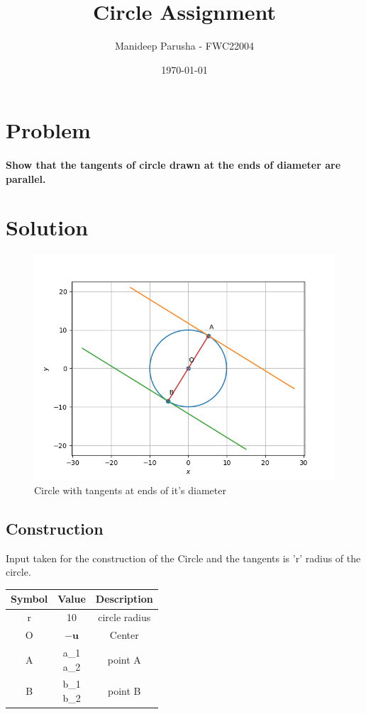 \documentclass[journal,12pt,twocolumn]{article}
\title{\textbf{Circle Assignment}}
\author{Manideep Parusha - FWC22004}
\date{\today}
\let\vec\mathbf
\newcommand{\myvec}[1]{\ensuremath{\begin{pmatrix}#1\end{pmatrix}}}
\begin{document}
\maketitle
\section*{Problem}
\paragraph{Show that the tangents of circle drawn at the ends of diameter are parallel.}

\section*{Solution}

\begin{figure}[h]
\centering
\includegraphics[width=\columnwidth]{figs/plot_cir.png}
\caption{Circle with tangents at ends of it's diameter}
\label{fig:cir_py}
\end{figure}

\subsection*{Construction}
Input taken for the construction of the Circle and the tangents is 'r' radius of the circle.

\begin{table}[h]
	\centering
\setlength\extrarowheight{2pt}
	\begin{tabular}{|c|c|c|}
		\hline
		\textbf{Symbol} & \textbf{Value} & \textbf{Description} \\
		\hline
		r & 10 & circle radius\\
		\hline
		O & $-\vec{u}$ & Center\\
		\hline
		A & \myvec{a_1\\a_2} & point A\\
		\hline
		B & \myvec{b_1\\b_2} & point B\\
		\hline
	\end{tabular}
\end{table}
\end{document}

